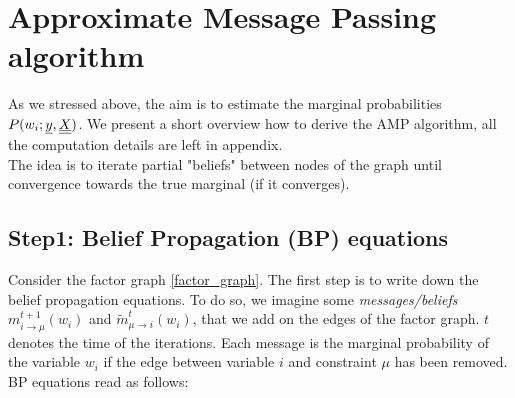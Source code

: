 \documentclass[aip,jmp,amsmath,amssymb,reprint]{revtex4}
\begin{document}


\newpage
\section{\Large Approximate Message Passing algorithm}

As we stressed above, the aim is to estimate the marginal probabilities $P(w_i;{\underline{y}},\underline{\underline{X}})$. We present a short overview how to derive the AMP algorithm, all the computation details are left in appendix.\\ 
The idea is to iterate partial "beliefs" between nodes of the graph until convergence towards the true marginal (if it converges).

\label{AMP}
\subsection{Step1: Belief Propagation (BP) equations}
Consider the factor graph \ref{factor_graph}.  
The first step is to write down the belief propagation equations. To do so, we imagine some \textit{messages/beliefs} $m_{i\to \mu}^{t+1} (w_i)$ and $\tilde{m}_{\mu \to i}^t (w_i) $, that we add on the edges of the factor graph. $t$ denotes the time of the iterations. Each message is the marginal probability of the variable $w_i$ if the edge between variable $i$ and constraint $\mu$ has been removed. BP equations read as follows: \\
\end{document}
